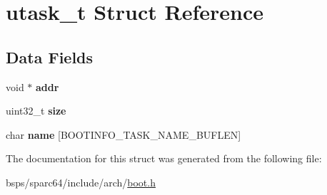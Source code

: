 \hypertarget{structutask__t}{}\section{utask\+\_\+t Struct Reference}
\label{structutask__t}
\subsection*{Data Fields}
\begin{DoxyCompactItemize}
\item 
\mbox{\label{structutask__t_a1c60ac388ffee4b1f64ebaffe34a5acd}} 
void $\ast$ {\bfseries addr}
\item 
\mbox{\label{structutask__t_a410a755df8143f3a516c7a374697c5ff}} 
uint32\+\_\+t {\bfseries size}
\item 
\mbox{\label{structutask__t_a7fb111c4c44ebab344c0d34a9122619b}} 
char {\bfseries name} \mbox{[}B\+O\+O\+T\+I\+N\+F\+O\+\_\+\+T\+A\+S\+K\+\_\+\+N\+A\+M\+E\+\_\+\+B\+U\+F\+L\+EN\mbox{]}
\end{DoxyCompactItemize}


The documentation for this struct was generated from the following file\+:\begin{DoxyCompactItemize}
\item 
bsps/sparc64/include/arch/\mbox{\hyperlink{sparc64_2include_2arch_2boot_8h}{boot.\+h}}\end{DoxyCompactItemize}
